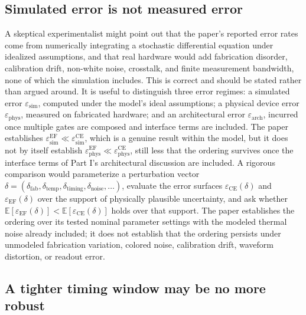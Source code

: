 \documentclass[11pt]{article}
\begin{document}
\subsection{Simulated error is not measured error}

A skeptical experimentalist might point out that the paper's reported error rates come from numerically integrating a stochastic differential equation under idealized assumptions, and that real hardware would add fabrication disorder, calibration drift, non-white noise, crosstalk, and finite measurement bandwidth, none of which the simulation includes. This is correct and should be stated rather than argued around. It is useful to distinguish three error regimes: a simulated error $\varepsilon_{\mathrm{sim}}$, computed under the model's ideal assumptions; a physical device error $\varepsilon_{\mathrm{phys}}$, measured on fabricated hardware; and an architectural error $\varepsilon_{\mathrm{arch}}$, incurred once multiple gates are composed and interface terms are included. The paper establishes $\varepsilon_{\mathrm{sim}}^{\mathrm{EF}}\ll\varepsilon_{\mathrm{sim}}^{\mathrm{CE}}$, which is a genuine result within the model, but it does not by itself establish $\varepsilon_{\mathrm{phys}}^{\mathrm{EF}}\ll\varepsilon_{\mathrm{phys}}^{\mathrm{CE}}$, still less that the ordering survives once the interface terms of Part I's architectural discussion are included. A rigorous comparison would parameterize a perturbation vector $\delta=(\delta_{\mathrm{fab}},\delta_{\mathrm{temp}},\delta_{\mathrm{timing}},\delta_{\mathrm{noise}},\ldots)$, evaluate the error surfaces $\varepsilon_{\mathrm{CE}}(\delta)$ and $\varepsilon_{\mathrm{EF}}(\delta)$ over the support of physically plausible uncertainty, and ask whether $\mathbb E[\varepsilon_{\mathrm{EF}}(\delta)] < \mathbb E[\varepsilon_{\mathrm{CE}}(\delta)]$ holds over that support. The paper establishes the ordering over its tested nominal parameter settings with the modeled thermal noise already included; it does not establish that the ordering persists under unmodeled fabrication variation, colored noise, calibration drift, waveform distortion, or readout error.

\subsection{A tighter timing window may be no more robust}
\end{document}
